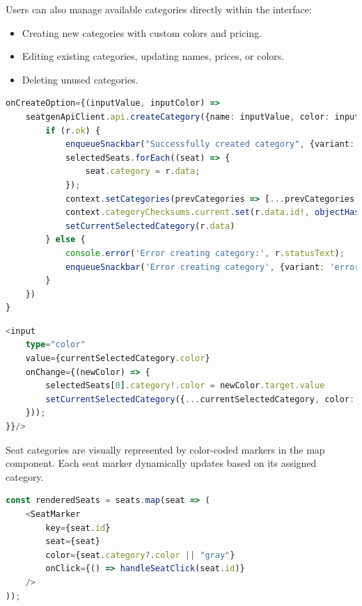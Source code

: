 Users can also manage available categories directly within the interface:
\begin{itemize}
    \item Creating new categories with custom colors and pricing.
    \item Editing existing categories, updating names, prices, or colors.
    \item Deleting unused categories.
\end{itemize}

\begin{lstlisting}[language=TypeScript, caption=Managing Categories, label=lst:manage-categories]
onCreateOption={(inputValue, inputColor) =>
    seatgenApiClient.api.createCategory({name: inputValue, color: inputColor}).then((r) => {
        if (r.ok) {
            enqueueSnackbar("Successfully created category", {variant: 'success'})
            selectedSeats.forEach((seat) => {
                seat.category = r.data;
            });
            context.setCategories(prevCategories => [...prevCategories, r.data]);
            context.categoryChecksums.current.set(r.data.id!, objectHash(r.data))
            setCurrentSelectedCategory(r.data)
        } else {
            console.error('Error creating category:', r.statusText);
            enqueueSnackbar('Error creating category', {variant: 'error'});
        }
    })
}
\end{lstlisting}

\begin{lstlisting}[language=TypeScript, caption=Managing Category Color, label=lst:manage-categories]
<input 
    type="color"
    value={currentSelectedCategory.color}
    onChange={(newColor) => {
        selectedSeats[0].category!.color = newColor.target.value
        setCurrentSelectedCategory({...currentSelectedCategory, color: newColor.target.value})
    }));
}}/>
\end{lstlisting}

Seat categories are visually represented by color-coded markers in the map component. Each seat marker dynamically updates based on its assigned category.

\begin{lstlisting}[language=TypeScript, caption=Rendering Seat Markers with Categories, label=lst:render-seat-category]
const renderedSeats = seats.map(seat => (
    <SeatMarker 
        key={seat.id} 
        seat={seat} 
        color={seat.category?.color || "gray"} 
        onClick={() => handleSeatClick(seat.id)}
    />
));
\end{lstlisting}


